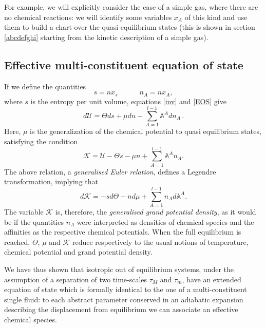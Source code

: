 \documentclass[useAMS,usenatbib,prd,twocolumn,nofootinbib]{revtex4-1}
\newcommand{\spc}{\quad \quad \quad}
\begin{document}
For example, we will explicitly consider the case of a simple gas, where there are no chemical reactions: we will identify some variables $x_A$ of this kind and use them to build a chart over the quasi-equilibrium states (this is shown in section \ref{abcdefghi} starting from the kinetic description of a simple gas). 
 

\subsection{Effective multi-constituent equation of state}

If we define the quantities
\begin{equation}
s = n x_s \spc  n_A = n x_A ,
\end{equation}
where $s$ is the entropy per unit volume, equations \eqref{inv} and \eqref{EOS}  give
\begin{equation}\label{eos}
d \mathcal{U} = \Theta ds +  \mu dn - \sum_{A=1}^{l-1} \mathbb{A}^A d n_A \, .
\end{equation}
Here, $\mu$ is the generalization of the chemical potential to quasi equilibrium states, satisfying the condition
\begin{equation}\label{euller}
\mathcal{K} = \mathcal{U} - \Theta s - \mu n +  \sum_{A=1}^{l-1} \mathbb{A}^A  n_A .
\end{equation}
The above relation, a \textit{generalised Euler relation}, defines a Legendre transformation, implying that
\begin{equation}\label{gringooooo}
d\mathcal{K} = -s d\Theta - n d\mu + \sum_{A=1}^{l-1}   n_A d\mathbb{A}^A.
\end{equation}
The variable $\mathcal{K}$ is, therefore, the \textit{generalised grand potential density}, as it would be if the quantities $n_A$ were interpreted as densities of chemical species and the affinities as the respective chemical potentials.
When the full equilibrium is reached, $\Theta$, $\mu$ and $\mathcal{K}$ reduce respectively to the usual notions of temperature, chemical potential and grand potential density.

We have thus shown that isotropic out of equilibrium systems, under the assumption of a separation of two time-scales $\tau_M$ and $\tau_m$, have an extended equation of state which is formally identical to the one of a multi-constituent single fluid: to each abstract parameter conserved in an adiabatic expansion describing the displacement from equilibrium we can associate an effective chemical species.
\end{document}
